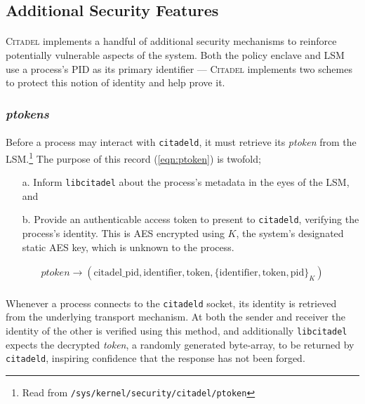 \subsection{Additional Security Features}
\label{sec:additional-security}
\paragraph{} \textsc{Citadel} implements a handful of additional security mechanisms to reinforce potentially vulnerable aspects of the system. Both the policy enclave and LSM use a process's PID as its primary identifier --- \textsc{Citadel} implements two schemes to protect this notion of identity and help prove it.

\subsubsection{\textit{ptokens}}
\label{sec:ptokens}
\paragraph{} Before a process may interact with \texttt{citadeld}, it must retrieve its \textit{ptoken} from the LSM.\footnote{Read from \texttt{/sys/kernel/security/citadel/ptoken}} The purpose of this record (\ref{eqn:ptoken}) is twofold;
\begin{enumerate}
    \item[a.] Inform \texttt{libcitadel} about the process's metadata in the eyes of the LSM, and
    \item[b.] Provide an authenticable access token to present to \texttt{citadeld}, verifying the process's identity. This is AES encrypted using $K$, the system's designated static AES key, which is unknown to the process. 
\end{enumerate}

\vspace{-7mm}
\begin{align}
    \textit{ptoken} \rightarrow ( \text{citadel\_pid}, \text{identifier}, \text{token}, \{\text{identifier}, \text{token}, \text{pid}\}_K) \label{eqn:ptoken}
\end{align}

\paragraph{} Whenever a process connects to the \texttt{citadeld} socket, its identity is retrieved from the underlying transport mechanism. At both the sender and receiver the identity of the other is verified using this method, and additionally \texttt{libcitadel} expects the decrypted \textit{token}, a randomly generated byte-array, to be returned by \texttt{citadeld}, inspiring confidence that the response has not been forged.

